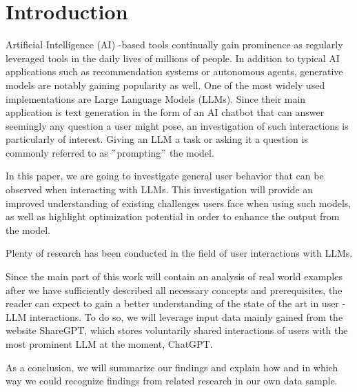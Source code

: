 
\section{Introduction}
\label{sec:introduction}

%
%
%



%
%
\sloppy %
Artificial Intelligence (AI) -based tools continually gain prominence as regularly leveraged tools in the
daily lives of millions of people.
In addition to typical AI applications such as recommendation systems or autonomous agents, generative
models are notably gaining popularity as well.
One of the most widely used implementations are Large Language Models (LLMs).
Since their main application is text generation in the form of an AI chatbot that can answer seemingly
any question a user might pose, an investigation of such interactions is particularly of interest.
Giving an LLM a task or asking it a question is commonly referred to as \("\)prompting\("\) the model.

In this paper, we are going to investigate general user behavior that can be observed when interacting
with LLMs.
This investigation will provide an improved understanding of existing challenges users face when
using such models, as well as highlight optimization potential in order to enhance the output from
the model.

Plenty of research has been conducted in the field of user interactions with LLMs.

Since the main part of this work will contain an analysis of real world examples after we have
sufficiently described all necessary concepts and prerequisites, the reader can expect to gain a better
understanding of the state of the art in user - LLM interactions.
To do so, we will leverage input data mainly gained from the website ShareGPT, %
which stores voluntarily shared interactions of users with the most prominent LLM at the moment,
ChatGPT. %

As a conclusion, we will summarize our findings and explain how and in which way we could recognize
findings from related research in our own data sample.
